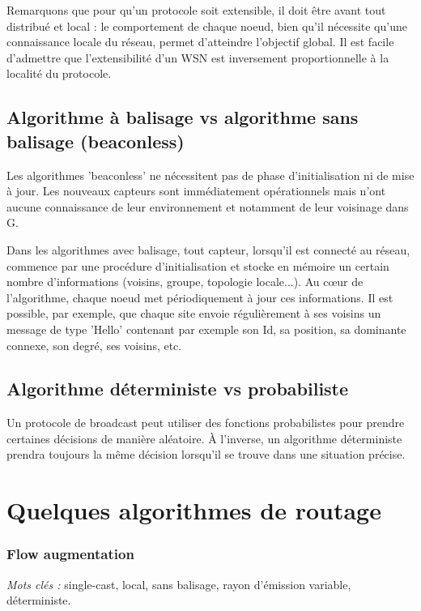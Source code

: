 Remarquons que pour qu'un protocole soit extensible, il doit être avant tout distribué et local :  le comportement de chaque noeud, bien qu'il nécessite qu'une connaissance locale du réseau, permet d'atteindre l'objectif global. Il est facile d'admettre que l'extensibilité d'un WSN est inversement proportionnelle à la localité du protocole.



\subsection{Algorithme à balisage vs algorithme sans balisage (beaconless)}
Les algorithmes 'beaconless' ne nécessitent pas de phase d'initialisation ni de mise à jour. Les nouveaux capteurs sont immédiatement opérationnels mais n'ont aucune connaissance de leur environnement et notamment de leur voisinage dans G. 

Dans les algorithmes avec balisage, tout capteur, lorsqu'il est connecté au réseau, commence par une procédure d'initialisation et stocke en mémoire un certain nombre d'informations (voisins, groupe, topologie locale...). Au cœur de l'algorithme, chaque noeud met périodiquement à jour ces informations. Il est possible, par exemple, que chaque site envoie régulièrement à ses voisins un message de type
'Hello' contenant par exemple son Id, sa position, sa dominante connexe, son degré, ses voisins, etc.



\subsection{Algorithme déterministe vs probabiliste}
Un protocole de broadcast peut utiliser des fonctions probabilistes pour prendre certaines décisions de manière aléatoire.
À l'inverse, un algorithme déterministe prendra toujours la même décision lorsqu'il se trouve dans une situation précise.



\section{Quelques algorithmes de routage}


\subsubsection{Flow augmentation \cite{Chang2000}}
\emph{Mots clés :} single-cast, local, sans balisage, rayon d'émission variable, déterministe.

